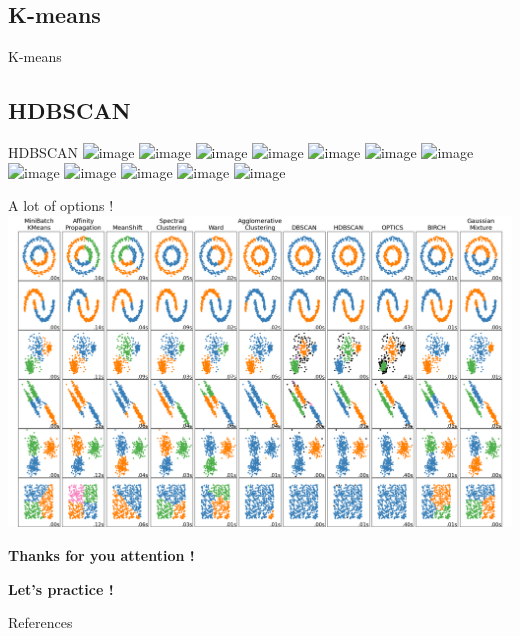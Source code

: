 \documentclass{irdbeamer}
\begin{document}
\subsection{K-means}
\begin{frame}{K-means}
    
\end{frame}

\subsection{HDBSCAN}
\begin{frame}{HDBSCAN}
    \centering
    \includegraphics<1>[width=.7\textwidth]{./figs/hdbscan/1.png}%
    \includegraphics<2>[width=.7\textwidth]{./figs/hdbscan/2.png}%
    \includegraphics<3>[width=.7\textwidth]{./figs/hdbscan/3.png}%
    \includegraphics<4>[width=.7\textwidth]{./figs/hdbscan/4.png}%
    \includegraphics<5>[width=.7\textwidth]{./figs/hdbscan/5.png}%
    \includegraphics<6>[width=.7\textwidth]{./figs/hdbscan/6.png}%
    \includegraphics<7>[width=.7\textwidth]{./figs/hdbscan/7.png}%
    \includegraphics<8>[width=.7\textwidth]{./figs/hdbscan/8.png}%
    \includegraphics<9>[width=.7\textwidth]{./figs/hdbscan/9.png}%
    \includegraphics<10>[width=.7\textwidth]{./figs/hdbscan/10.png}%
    \includegraphics<11>[width=.7\textwidth]{./figs/hdbscan/11.png}%
    \includegraphics<12>[width=.7\textwidth]{./figs/hdbscan/12.png}%
\end{frame}

\begin{frame}{A lot of options !}
    \centering
    \includegraphics[width=.7\textwidth]{./figs/all_clusterings.png}
\end{frame}


\begin{frame}[plain]
    \Huge{\textbf{Thanks for you attention !}}
    
    \vfill
    
    \LARGE{\textbf{Let's practice !}}
\end{frame}

\appendix
\begin{frame}[allowframebreaks]{References}
    {\footnotesize \printbibliography[heading=none]}
\end{frame}
\end{document}
